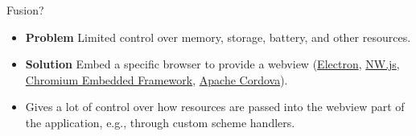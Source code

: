 \begin{frame}{Fusion?} %

\begin{itemize}[<+->]
\tightlist
\item \textbf{Problem}
	Limited control over memory, storage, battery, and other
	resources.
\item \textbf{Solution}
	Embed a specific browser to provide a webview (\href{https://www.electronjs.org/}{Electron}, \href{https://nwjs.io/}{NW.js},
	\href{https://bitbucket.org/chromiumembedded/cef}{Chromium Embedded Framework}, \href{https://cordova.apache.org/}{Apache Cordova}).
\item
  Gives a lot of control over how resources are passed into the
  webview part of the application, e.g., through custom scheme handlers.
\end{itemize}


\end{frame}

